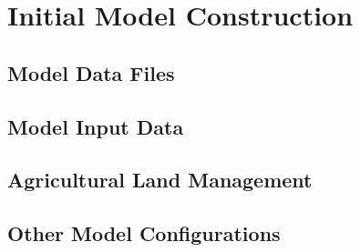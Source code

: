 \section{Initial Model Construction}
	\subsection{Model Data Files}
		
	\subsection{Model Input Data}
		
		
		
		
		
		
		
	\pagebreak
	\subsection{Agricultural Land Management}\label{sec:ag_land_mgt}
		
		
		
	\pagebreak
	\subsection{Other Model Configurations}
		
		
		
		
		
\pagebreak